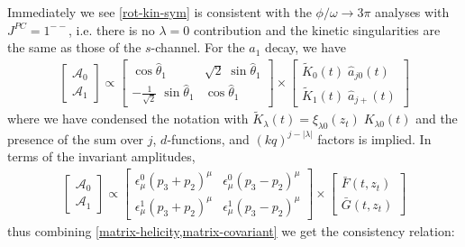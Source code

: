 \documentclass[10pt, aps,prd,amsmath,amssymb,superscriptaddress,onecolumn,
nofootinbib,showpacs,preprintnumbers]{revtex4-1}
\begin{document}
Immediately we see \cref{rot-kin-sym} is consistent with the \(\phi/\omega \to 3\pi\) analyses \cite{Danilkin:2014cra,Niecknig:2012sj} with \(J^{PC} = 1^{--}\), i.e. there is no \(\lambda = 0\) contribution and the kinetic singularities are the same as those of the \(s\)-channel. For the \(a_1\) decay, we have
  \begin{align} \label{matrix-helicity}
    \begin{bmatrix}
    \mathcal{A}_0 \\
    \mathcal{A}_1
    \end{bmatrix}
    \propto
    \begin{bmatrix}
        \cos \hat{\theta}_1  &  \sqrt{2} \; \sin \hat{\theta}_1   \\
       - \frac{1}{\sqrt{2}}  \; \sin \hat{\theta}_1  & \cos \hat{\theta}_1
    \end{bmatrix}
    \times
    \begin{bmatrix}
       \tilde{K}_{0}(t) \; \hat{a}_{j0}(t) \\
     \tilde{K}_{1}(t) \;   \hat{a}_{j+}(t)
    \end{bmatrix}
  \end{align}
where we have condensed the notation with \(\tilde{K}_\lambda(t) = \xi_{\lambda0}(z_t) \; K_{\lambda0}(t)\) and the presence of the sum over \(j\), \(d\)-functions, and \((kq)^{j-|\lambda|}\) factors is implied. In terms of the invariant amplitudes,
  \begin{align} \label{matrix-covariant}
    \begin{bmatrix}
    \mathcal{A}_0 \\
    \mathcal{A}_1
    \end{bmatrix}
    \propto
    \begin{bmatrix}
      \epsilon_\mu^0 (p_3 + p_2)^\mu & \epsilon_\mu^0 (p_3 - p_2)^\mu \\
    \epsilon_\mu^1  (p_3 + p_2)^\mu & \epsilon_\mu^1 (p_3 - p_2)^\mu
    \end{bmatrix}
    \times
    \begin{bmatrix}
      \bar{F}(t,z_t) \\
       \bar{G}(t,z_t)
    \end{bmatrix}
  \end{align}
thus combining \cref{matrix-helicity,matrix-covariant} we get the consistency relation:
\end{document}
